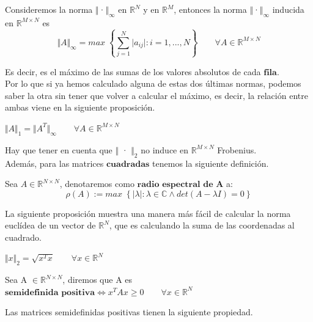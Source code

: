 \begin{nprop}
Consideremos la norma $\Vert$·$\Vert _\infty$ en $\mathbb{R}^N$ y en $\mathbb{R}^M$, entonces la norma $\Vert$·$\Vert _\infty$ inducida en $\mathbb{R}^{M \times N}$ es
\[ \Vert A \Vert _\infty = max \; \left\lbrace \sum_{j=1}^N \vert a_{ij} \vert : i = 1,...,N \right\rbrace \qquad \forall A \in \mathbb{R}^{M \times N} \]
\end{nprop}

Es decir, es el máximo de las sumas de los valores absolutos de cada $\textbf{fila}$.\\

Por lo que si ya hemos calculado alguna de estas dos últimas normas, podemos saber la otra sin tener que volver a calcular el máximo, es decir, la relación entre ambas viene en la siguiente proposición.

\begin{nprop}
$\Vert A \Vert _1 = \Vert A^T \Vert _\infty \qquad \forall A \in \mathbb{R}^{M \times N}$
\end{nprop}

Hay que tener en cuenta que $\Vert$ · $\Vert _2$ no induce en $\mathbb{R}^{M \times N}$ Frobenius.\\

Además, para las matrices $\textbf{cuadradas}$ tenemos la siguiente definición.

\begin{ndef}
Sea $A \in \mathbb{R}^{N \times N}$, denotaremos como $\textbf{radio espectral de A}$ a:
\[ \rho (A) := max \; \left\lbrace \vert \lambda \vert : \lambda \in \mathbb{C} \wedge det(A - \lambda I) = 0 \right\rbrace \]
\end{ndef}

La siguiente proposición muestra una manera más fácil de calcular la norma euclídea de un vector de $\mathbb{R}^N$, que es calculando la suma de las coordenadas al cuadrado.

\begin{nprop}
$\Vert x \Vert _2 = \sqrt{x^Tx} \qquad \forall x \in \mathbb{R}^N$
\end{nprop}

\begin{ndef}
Sea A $\in \mathbb{R}^{N \times N}$, diremos que A es $\textbf{semidefinida positiva} \Leftrightarrow x^TAx \geq 0 \qquad \forall x \in \mathbb{R}^N $
\end{ndef}

Las matrices semidefinidas positivas tienen la siguiente propiedad.


